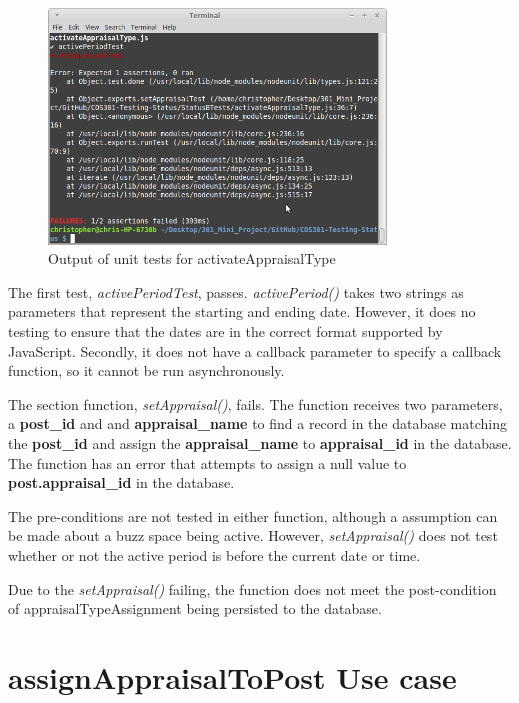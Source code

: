 \documentclass[a4paper,12pt]{article}
\begin{document}
	\begin{figure}[H]
		\centering
		\includegraphics[width=0.8\textwidth]{Figures/activateAppraisalTypeUnitTestOutput.png}
		\caption{Output of unit tests for activateAppraisalType}
	\end{figure}

The first test, \textit{activePeriodTest}, passes. \textit{activePeriod()} takes two strings as parameters that represent the starting and ending date. However, it does no testing to ensure that the dates are in the correct format supported by JavaScript. Secondly, it does not have a callback parameter to specify a callback function, so it cannot be run asynchronously.

The section function, \textit{setAppraisal()}, fails. The function receives two parameters, a \textbf{post\_id} and and \textbf{appraisal\_name} to find a record in the database matching the \textbf{post\_id} and assign the \textbf{appraisal\_name} to \textbf{appraisal\_id} in the database. The function has an error that attempts to assign a null value to \textbf{post.appraisal\_id} in the database. 

The pre-conditions are not tested in either function, although a assumption can be made about a buzz space being active. However, \textit{setAppraisal()} does not test whether or not the active period is before the current date or time.

Due to the \textit{setAppraisal()} failing, the function does not meet the post-condition of appraisalTypeAssignment being persisted to the database.

\newpage
\section{assignAppraisalToPost Use case}
\end{document}

